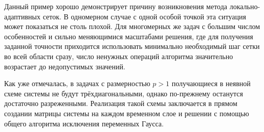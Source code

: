 Данный пример хорошо демонстрирует причину возникновения метода локально-адаптивных сеток.
В одномерном случае с одной особой точкой эта ситуация может показаться не столь плохой.
Для многомерных же задач с большим числом особенностей и сильно меняющимися масштабами решения, где для получения заданной точности приходится использовать минимально необходимый шаг сетки во всей области сразу, число ненужных операций алгоритма значительно возрастает до недопустимых значений. 

Как уже отмечалась, в задачах с размерностью $p > 1$ получающиеся в неявной схеме системы не будут трёхдиагональными, однако по-прежнему останутся достаточно разреженными.
Реализация такой схемы заключается в прямом создании матрицы системы на каждом временном слое и решении с помощью общего алгоритма исключения переменных Гаусса.

